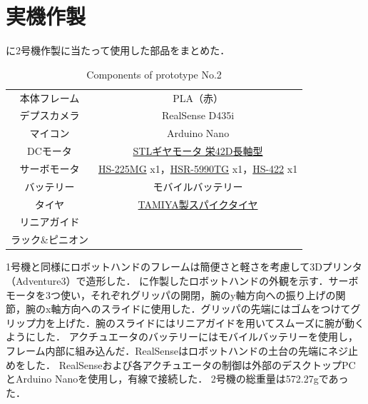 \section{実機作製}

に2号機作製に当たって使用した部品をまとめた．

\begin{table}[H]
    \centering
    \caption{Components of prototype No.2}
    \begin{tabular}{cc}\toprule
        本体フレーム & PLA（赤） \\
        デプスカメラ & RealSense D435i \\ 
        マイコン & Arduino Nano \\ 
        DCモータ & \href{http://akizukidenshi.com/catalog/g/gM-12379/}{STLギヤモータ 栄42D長軸型} \\ 
        サーボモータ & \href{https://hitecrcd.co.jp/products/servo32225/}{HS-225MG} x1，\href{https://hitecrcd.com/products/servos/discontinued-servos-servo-accessories/hsr-5990tg-hmi-ultra-premium-robot-servo/product}{HSR-5990TG} x1，\href{https://hitecrcd.co.jp/products/servo31422s/}{HS-422} x1 \\ 
        バッテリー & モバイルバッテリー \\ 
        タイヤ & \href{https://tamiya.com/japan/products/70194/index.html}{TAMIYA製スパイクタイヤ} \\
        リニアガイド &  \\
        ラック\&ピニオン &  \\ \bottomrule
    \end{tabular} 
    \label{tab:2号機部品}
\end{table}

1号機と同様にロボットハンドのフレームは簡便さと軽さを考慮して3Dプリンタ（Adventure3）で造形した．
に作製したロボットハンドの外観を示す．サーボモータを3つ使い，それぞれグリッパの開閉，腕のy軸方向への振り上げの関節，腕のx軸方向へのスライドに使用した．グリッパの先端にはゴムをつけてグリップ力を上げた．腕のスライドにはリニアガイドを用いてスムーズに腕が動くようにした．
アクチュエータのバッテリーにはモバイルバッテリーを使用し，フレーム内部に組み込んだ．RealSenseはロボットハンドの土台の先端にネジ止めをした．
RealSenseおよび各アクチュエータの制御は外部のデスクトップPCとArduino Nanoを使用し，有線で接続した．
2号機の総重量は572.27gであった．

